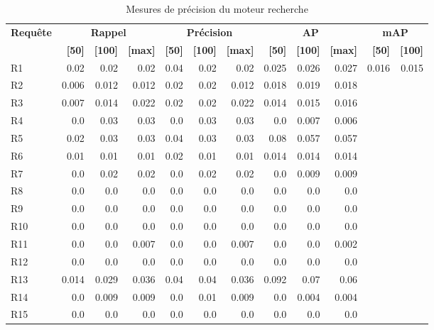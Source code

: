 \begin{table}[H]
\centering
\begin{tabular}{l|rrr|rrr|rrr|rr}
\toprule
\textbf{Requête} & \multicolumn{3}{c}{\textbf{Rappel}} & \multicolumn{3}{c}{\textbf{Précision}} & \multicolumn{3}{c}{\textbf{AP}} & \multicolumn{2}{c}{\textbf{mAP}} \\
 & \textbf{[50]} & \textbf{[100]} & \textbf{[max]} & \textbf{[50]} & \textbf{[100]} & \textbf{[max]} & \textbf{[50]} & \textbf{[100]} & \textbf{[max]} & \textbf{[50]} & \textbf{[100]} \\
\midrule
R1 & 0.02 & 0.02 & 0.02 & 0.04 & 0.02 & 0.02 & 0.025 & 0.026 & 0.027 & \multirow{15}{*}{0.016} & \multirow{15}{*}{0.015} \\
R2 & 0.006 & 0.012 & 0.012 & 0.02 & 0.02 & 0.012 & 0.018 & 0.019 & 0.018 \\
R3 & 0.007 & 0.014 & 0.022 & 0.02 & 0.02 & 0.022 & 0.014 & 0.015 & 0.016 \\
R4 & 0.0 & 0.03 & 0.03 & 0.0 & 0.03 & 0.03 & 0.0 & 0.007 & 0.006 \\
R5 & 0.02 & 0.03 & 0.03 & 0.04 & 0.03 & 0.03 & 0.08 & 0.057 & 0.057 \\
R6 & 0.01 & 0.01 & 0.01 & 0.02 & 0.01 & 0.01 & 0.014 & 0.014 & 0.014 \\
R7 & 0.0 & 0.02 & 0.02 & 0.0 & 0.02 & 0.02 & 0.0 & 0.009 & 0.009 \\
R8 & 0.0 & 0.0 & 0.0 & 0.0 & 0.0 & 0.0 & 0.0 & 0.0 & 0.0 \\
R9 & 0.0 & 0.0 & 0.0 & 0.0 & 0.0 & 0.0 & 0.0 & 0.0 & 0.0 \\
R10 & 0.0 & 0.0 & 0.0 & 0.0 & 0.0 & 0.0 & 0.0 & 0.0 & 0.0 \\
R11 & 0.0 & 0.0 & 0.007 & 0.0 & 0.0 & 0.007 & 0.0 & 0.0 & 0.002 \\
R12 & 0.0 & 0.0 & 0.0 & 0.0 & 0.0 & 0.0 & 0.0 & 0.0 & 0.0 \\
R13 & 0.014 & 0.029 & 0.036 & 0.04 & 0.04 & 0.036 & 0.092 & 0.07 & 0.06 \\
R14 & 0.0 & 0.009 & 0.009 & 0.0 & 0.01 & 0.009 & 0.0 & 0.004 & 0.004 \\
R15 & 0.0 & 0.0 & 0.0 & 0.0 & 0.0 & 0.0 & 0.0 & 0.0 & 0.0 \\
\bottomrule
\end{tabular}
\caption{Mesures de précision du moteur recherche}
\label{tab:results}
\end{table}
